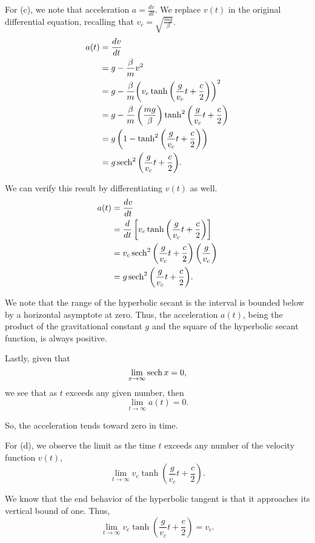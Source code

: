 \documentclass[../hw11]{subfiles}
\begin{document}
For (c), we note that acceleration $a=\frac{dv}{dt}$. We replace $v(t)$ in the original differential equation, recalling that $v_c=\sqrt{\frac{mg}{\beta}}$.
\begin{align*}
    a(t)&=\frac{dv}{dt} \\
    &=g-\frac{\beta}{m} v^2 \\
    &=g-\frac{\beta}{m} {\left( v_c\tanh{\left( \frac{g}{v_c}t+\frac{c}{2} \right)} \right)}^2 \\
    &=g-\frac{\beta}{m}\left( \frac{mg}{\beta} \right)\tanh^2{\left( \frac{g}{v_c}t+\frac{c}{2} \right)} \\
    &=g\left( 1- \tanh^2{\left( \frac{g}{v_c}t+\frac{c}{2} \right)}\right) \\
    &=g\operatorname{sech}^2{\left( \frac{g}{v_c}t+\frac{c}{2} \right)}. \\
\end{align*}

We can verify this result by differentiating $v(t)$ as well.
\begin{align*}
    a(t)&=\frac{dv}{dt} \\
    &= \frac{d}{dt}\left[v_c\tanh{\left( \frac{g}{v_c}t+\frac{c}{2} \right)}\right] \\
    &= v_c\operatorname{sech}^2{\left(\frac{g}{v_c}t+\frac{c}{2}\right)}\left(\frac{g}{v_c}\right) \\
    &=g\operatorname{sech}^2{\left( \frac{g}{v_c}t+\frac{c}{2} \right)}. \\
\end{align*}

We note that the range of the hyperbolic secant is the interval is bounded below by a horizontal asymptote at zero. Thus, the acceleration $a(t)$, being the product of the gravitational constant $g$ and the square of the hyperbolic secant function, is always positive.

Lastly, given that \[\lim\limits_{x\to\infty} \operatorname{sech}{x} = 0,\]
we see that as $t$ exceeds any given number, then \[\lim\limits_{t\to\infty} a(t) = 0.\]

So, the acceleration tends toward zero in time.

For (d), we observe the limit as the time $t$ exceeds any number of the velocity function $v(t)$,
\[\lim\limits_{t\to\infty} v_c\tanh{\left( \frac{g}{v_c}t+\frac{c}{2} \right)}.\] 

We know that the end behavior of the hyperbolic tangent is that it approaches its vertical bound of one. Thus, 
\[\lim\limits_{t\to\infty} v_c\tanh{\left( \frac{g}{v_c}t+\frac{c}{2} \right)} = v_c.\] 
\end{document}
